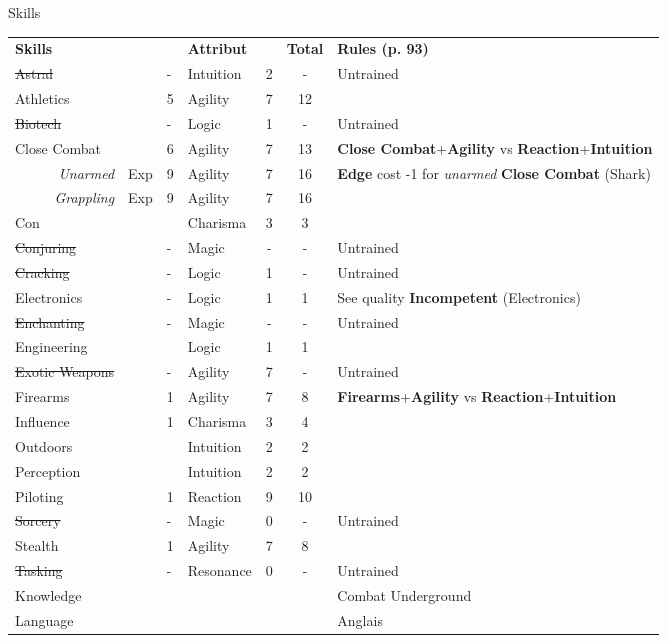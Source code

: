 \documentclass[french, a4paper]{scrartcl}
\begin{document}
	\begin{srbox}{Skills}
		\begin{tabular}{l l l l c c l} \\		
			\textbf{Skills}     &     &   & \textbf{Attribut} &   & \textbf{Total} & \textbf{Rules (p. 93)} \\
			\st{Astral}         &     & - & Intuition & 2 & -     & Untrained \\
			Athletics           &     & 5 & Agility   & 7 & 12    & \\
			\st{Biotech}        &     & - & Logic     & 1 & -     & Untrained \\			
			Close Combat        &     & 6 & Agility   & 7 & 13    & \textbf{Close Combat}+\textbf{Agility} vs \textbf{Reaction}+\textbf{Intuition} \\
			\multicolumn{1}{r}{\textit{Unarmed}}  & Exp & 9 & Agility   & 7 & 16    & \textbf{Edge} cost -1 for \textit{unarmed} \textbf{Close Combat} (Shark) \\
			\multicolumn{1}{r}{\textit{Grappling}}& Exp & 9 & Agility   & 7 & 16    & \\
			Con                 &     &   & Charisma  & 3 & 3     & \\
			\st{Conjuring}      &     & - & Magic     & - & -     & Untrained \\			
			\st{Cracking}       &     & - & Logic     & 1 & -     & Untrained \\			
		    Electronics 		&	  & - &	Logic     & 1 & 1     & See quality \textbf{Incompetent} (Electronics) \\
   			\st{Enchanting}     &     & - & Magic     & - & -     & Untrained \\			
			Engineering 		&	  &   &	Logic     & 1 & 1     & \\
			\st{Exotic Weapons} &     & - & Agility   & 7 & -     & Untrained \\			
            Firearms  			&	  & 1 & Agility   & 7 & 8     & \textbf{Firearms}+\textbf{Agility} vs \textbf{Reaction}+\textbf{Intuition} \\
            Influence 			&     & 1 &	Charisma  & 3 & 4     & \\
			Outdoors 			&	  &   & Intuition & 2 & 2     & \\
			Perception 			&     &   & Intuition & 2 & 2     & \\
            Piloting         	&     & 1 &	Reaction  & 9 & 10    & \\
			\st{Sorcery}        &     & - & Magic     & 0 & -     & Untrained \\			
			Stealth  			&     & 1 &	Agility   & 7 & 8     & \\
			\st{Tasking}    	&     & - &	Resonance & 0 & -     & Untrained \\
			Knowledge 			&	  &   &           &   &       & Combat Underground \\	
			Language            &     &   &           &   &       & Anglais \\	
		\end{tabular}	
	\end{srbox}
\end{document}
